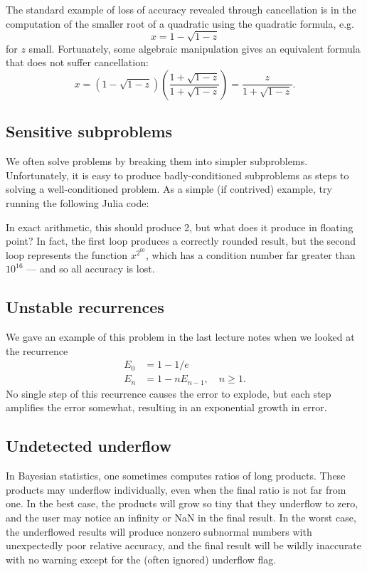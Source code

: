 \documentclass[12pt, leqno]{article}
\begin{document}
The standard example of loss of accuracy revealed through cancellation
is in the computation of the smaller root of a quadratic using the
quadratic formula, e.g.
\[
  x = 1-\sqrt{1-z}
\]
for $z$ small.  Fortunately, some algebraic manipulation gives an
equivalent formula that does not suffer cancellation:
\[
  x =
    \left( 1-\sqrt{1-z} \right)
    \left(\frac{1+\sqrt{1-z}}{1+\sqrt{1-z}}\right)
  =
    \frac{z}{1+\sqrt{1-z}}.
\]

\subsection*{Sensitive subproblems}

We often solve problems by breaking them into simpler subproblems.
Unfortunately, it is easy to produce badly-conditioned subproblems
as steps to solving a well-conditioned problem.  As a simple (if
contrived) example, try running the following Julia code:

\lstset{language=julia,frame=lines,columns=flexible}


In exact arithmetic, this should produce 2, but what does it produce
in floating point?  In fact, the first loop produces a correctly
rounded result, but the second loop represents the function
$x^{2^{60}}$, which has a condition number far greater than $10^{16}$
--- and so all accuracy is lost.

\subsection*{Unstable recurrences}

We gave an example of this problem in the last lecture notes when we
looked at the recurrence
\begin{align*}
  E_0 &= 1-1/e \\
  E_n &= 1-nE_{n-1}, \quad n \geq 1.
\end{align*}
No single step of this recurrence causes the error to explode, but
each step amplifies the error somewhat, resulting in an exponential
growth in error.

\subsection*{Undetected underflow}

In Bayesian statistics, one sometimes computes ratios of long
products.  These products may underflow individually, even when the
final ratio is not far from one.  In the best case, the products will
grow so tiny that they underflow to zero, and the user may notice an
infinity or NaN in the final result.  In the worst case, the
underflowed results will produce nonzero subnormal numbers with
unexpectedly poor relative accuracy, and the final result will be
wildly inaccurate with no warning except for the (often ignored)
underflow flag.
\end{document}
